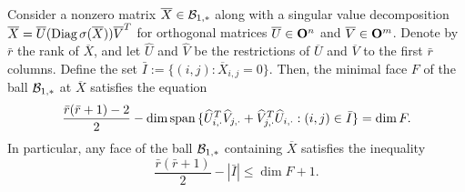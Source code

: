 \documentclass[smallextended,numbook]{svjour3}
\begin{document}
\begin{thm} \label{thm:exposed_main}{\hfill \\}
Consider a nonzero matrix $\overline{X}\in {{\cal B}}_{1,*}$ along with a singular value decomposition $\overline{X}=\overline{U}({\mbox{\rm Diag}\,}\sigma(\overline{X})) \overline{V}^T$ for orthogonal matrices $\overline{U}\in {\bf O}^{n}$ and $\overline{V}\in {\bf O}^m$.  Denote by $\bar{r}$ the rank of $\overline{X}$, and let $\widehat{U}$ and $\widehat{V}$ be the restrictions of $\overline{U}$ and $\overline{V}$ to the first $\bar{r}$ columns.
Define the set $\bar{I}:=\{(i,j): \overline{X}_{i,j}=0\}$. 
Then, the minimal face $F$ of the ball ${{\cal B}}_{1,*}$ at $\overline{X}$ satisfies the equation
\begin{equation}\label{eqn:char_extr}
\frac{\bar{r}(\bar{r}+1)-2}{2}- \dim{\mbox{\rm span}\,} \{\widehat{U}^T_{i,\cdot}\widehat{V}_{j,\cdot}+\widehat{V}^T_{j,\cdot}\widehat{U}_{i,\cdot} : (i,j)\in\bar{I}\}  = \dim F.
\end{equation}
In particular, any face of the ball ${{\cal B}}_{1,*}$ containing $\overline{X}$ satisfies the inequality
$$\frac{\bar{r}(\bar{r}+1)}{2} -|\bar{I}|\leq \dim F+1.$$
\end{thm}
\end{document}
